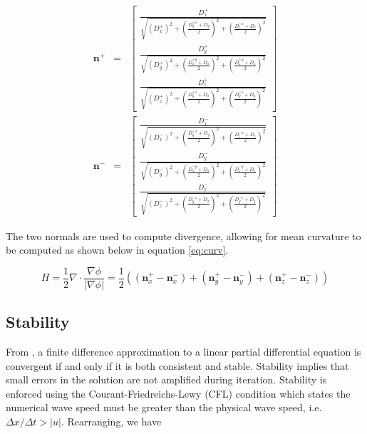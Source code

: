 \begin{eqnarray}
\textbf{n}^+ &=& \left[
  \begin{array}{ c }
     \frac{D_x^+}{\sqrt{(D_x^+)^2 + {\left(\frac{D_y^{+x}+D_y}{2}\right)}^2 +{\left(\frac{D_z^{+x}+D_z}{2}\right)}^2  }}  \\[2em]
     \frac{D_y^+}{\sqrt{(D_y^+)^2 + {\left(\frac{D_x^{+y}+D_x}{2}\right)}^2 +{\left(\frac{D_z^{+y}+D_z}{2}\right)}^2  }}  \\[2em]
     \frac{D_z^+}{\sqrt{(D_z^+)^2 + {\left(\frac{D_y^{+z}+D_x}{2}\right)}^2 +{\left(\frac{D_y^{+z}+D_y}{2}\right)}^2  }}  
  \end{array} \right] \\[2em]
\textbf{n}^- &=& \left[
  \begin{array}{ c }
     \frac{D_x^-}{\sqrt{(D_x^-)^2 + {\left(\frac{D_y^{-x}+D_y}{2}\right)}^2 +{\left(\frac{D_z^{-x}+D_z}{2}\right)}^2  }}  \\[2em]
     \frac{D_y^-}{\sqrt{(D_y^-)^2 + {\left(\frac{D_x^{-y}+D_x}{2}\right)}^2 +{\left(\frac{D_z^{-y}+D_z}{2}\right)}^2  }}  \\[2em]
     \frac{D_z^-}{\sqrt{(D_z^-)^2 + {\left(\frac{D_y^{-z}+D_x}{2}\right)}^2 +{\left(\frac{D_y^{-z}+D_y}{2}\right)}^2  }}  
  \end{array} \right] 
\label{eq:n}
\end{eqnarray}

The two normals are used to compute divergence, allowing for mean curvature to be computed as shown below in equation \eqref{eq:curv}.

\begin{equation}
H = \frac{1}{2}\nabla\cdot\frac{\nabla\phi}{|\nabla\phi|} = \frac{1}{2}((\textbf{n}_x^+ - \textbf{n}_x^-)+(\textbf{n}_y^+ - \textbf{n}_y^-)+(\textbf{n}_z^+ - \textbf{n}_z^-))
\label{eq:curv}
\end{equation}

\subsection{Stability}
From \cite{osher2003lsm}, a finite difference approximation to a linear partial differential equation is convergent if and only if it is both consistent and stable. Stability implies that small errors in the solution are not amplified during iteration. Stability is enforced using the Courant-Friedreichs-Lewy (CFL) condition which states the numerical wave speed must be greater than the physical wave speed, i.e. $\Delta x/\Delta t>|u|$. Rearranging, we have

